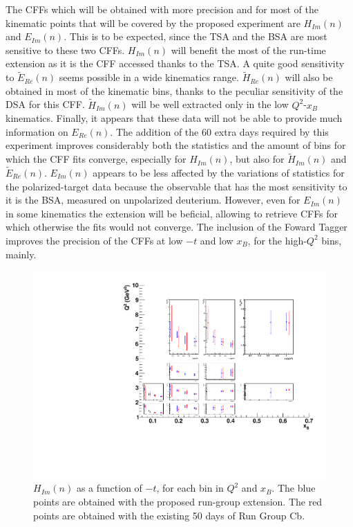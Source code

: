 The CFFs which will be obtained with more precision and for most of the kinematic points that will be covered by the proposed experiment are $H_{Im}(n)$ and $E_{Im}(n)$. This is to be expected, since the TSA and the BSA are most sensitive to these two CFFs. $H_{Im}(n)$ will benefit the most of the run-time extension as it is the CFF accessed thanks to the TSA. 
A quite good sensitivity to $\tilde{E}_{Re}(n)$ seems possible in a wide kinematics range. $\tilde{H}_{Re}(n)$ will also be obtained in most of the kinematic bins, thanks to the peculiar sensitivity of the DSA for this CFF. 
$\tilde{H}_{Im}(n)$ will be well extracted only in the low $Q^2$-$x_B$ kinematics. Finally, it appears that these data will not be able to provide much information on $E_{Re}(n)$.
The addition of the 60 extra days required by this experiment improves considerably both the statistics and the amount of bins for which the CFF fits converge, especially for $H_{Im}(n)$, but also for $\tilde{H}_{Im}(n)$ and $\tilde{E}_{Re}(n)$. $E_{Im}(n)$ appears to be less affected by the variations of statistics for the polarized-target data because the observable that has the most sensitivity to it is the BSA, measured on unpolarized deuterium. However, even for $E_{Im}(n)$ in some kinematics the extension will be beficial, allowing to retrieve CFFs for which otherwise the fits would not converge. 
The inclusion of the Foward Tagger improves the precision of the CFFs at low $-t$ and low $x_B$, for the high-$Q^2$ bins, mainly. 
\begin{figure}  
\begin{center}
\includegraphics[width=200mm]{mixed_CFF/100/mixed/CFF_him_compare3.pdf}
\caption[$H_{Im}(n)$ as a function of $-t$]
{$H_{Im}(n)$ as a function of $-t$, for each bin in $Q^2$ and $x_B$. The blue points are obtained with the proposed run-group extension. The red points are obtained with the existing 50 days of Run Group Cb.}\label{cff_him}
\end{center}
\end{figure}

